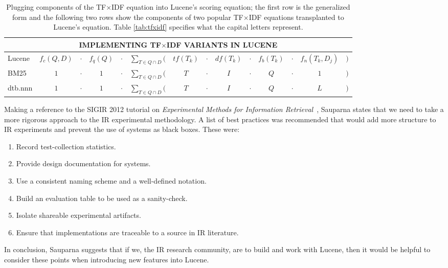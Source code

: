 \begin{table}[bht!]
  \centering
  \small
  \begin{minipage}[t]{0.94\textwidth}

    \begin{tabular}{lccccccccccccc}
      \multicolumn{14}{c}{IMPLEMENTING TF$\times$IDF VARIANTS IN LUCENE}
      \\
      \hline\hline

      Lucene    & $f_{c}(Q,D)$ & $\cdot$  & $f_{q}(Q)$
      & $\cdot$ & $\displaystyle\sum_{T \in Q \cap D}($  & $tf(T_{k})$
      & $\cdot$ & $df(T_{k})$  & $\cdot$  & $f_{b}(T_{k})$
      & $\cdot$ & $f_{n}(T_{k}, D_{j})$   & $)$ \\
      
      BM25      & $1$          &  $\cdot$ & $1$
      & $\cdot$ & $\displaystyle\sum_{T \in Q \cap D}($  & $T$
      & $\cdot$ & $I$          & $\cdot$  & $Q$
      & $\cdot$ & $1$          & $)$ \\

      dtb.nnn   & $1$          & $\cdot$  & $1$
      & $\cdot$ & $\displaystyle\sum_{T \in Q \cap D}($  & $T$
      & $\cdot$ & $I$          & $\cdot$  & $Q$
      & $\cdot$ & $L$          & $)$ \\

      \hline\hline
    \end{tabular}

    \caption{\small Plugging components of the TF$\times$IDF equation into
      Lucene's scoring equation; the first row is the generalized form
      and the following two rows show the components of two popular
      TF$\times$IDF equations transplanted to Lucene's equation. Table
      \ref{tab:tfxidf} specifies what the capital letters represent.}

    \label{tab:lucene}

  \end{minipage}
\end{table}


Making a reference to the SIGIR 2012 tutorial on \emph{Experimental
  Methods for Information
  Retrieval}~\cite{Metzler:2012:EMI:2348283.2348534}, Sauparna states
that we need to take a more rigorous approach to the IR experimental
methodology. A list of best practices was recommended that would add
more structure to IR experiments and prevent the use of systems as
black boxes. These were:

\begin{enumerate}
\item Record test-collection statistics.
\item Provide design documentation for systems.
\item Use a consistent naming scheme and a well-defined notation.
\item Build an evaluation table to be used as a sanity-check.
\item Isolate shareable experimental artifacts.
\item Ensure that implementations are traceable to a source in IR
  literature.
\end{enumerate}

In conclusion, Sauparna suggests that if we, the IR research
community, are to build and work with Lucene, then it would be helpful
to consider these points when introducing new features into Lucene.


